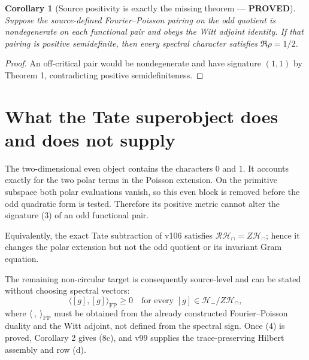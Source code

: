 \documentclass[11pt]{article}
\newcommand{\PROVED}{\textcolor{green!40!black}{\textbf{PROVED}}}
\newtheorem{corollary}{Corollary}
\begin{document}
\begin{corollary}[Source positivity is exactly the missing theorem ---
\PROVED]
Suppose the source-defined Fourier--Poisson pairing on the odd quotient is
nondegenerate on each functional pair and obeys the Witt adjoint identity.
If that pairing is positive semidefinite, then every spectral character
satisfies $\Re\rho=1/2$.
\end{corollary}

\begin{proof}
An off-critical pair would be nondegenerate and have signature $(1,1)$ by
Theorem 1, contradicting positive semidefiniteness.
\end{proof}

\section{What the Tate superobject does and does not supply}

The two-dimensional even object contains the characters $0$ and $1$.  It
accounts exactly for the two polar terms in the Poisson extension.  On the
primitive subspace both polar evaluations vanish, so this even block is
removed before the odd quadratic form is tested.  Therefore its positive
metric cannot alter the signature (3) of an odd functional pair.

Equivalently, the exact Tate subtraction of v106 satisfies
$\mathcal R\mathcal H_\cap=Z\mathcal H_\cap$; hence it changes the polar
extension but not the odd quotient or its invariant Gram equation.

The remaining non-circular target is consequently source-level and can be
stated without choosing spectral vectors:
\begin{equation}
 \boxed{
  \langle [g],[g]\rangle_{\mathrm{FP}}\ge0
  \quad\text{for every }[g]\in\mathcal H_-/Z\mathcal H_\cap,
 }                                                            \tag{4}
\end{equation}
where $\langle\ ,\ \rangle_{\mathrm{FP}}$ must be obtained from the
already constructed Fourier--Poisson duality and the Witt adjoint, not
defined from the spectral sign.  Once (4) is proved, Corollary 2 gives
(8c), and v99 supplies the trace-preserving Hilbert assembly and row (d).
\end{document}
